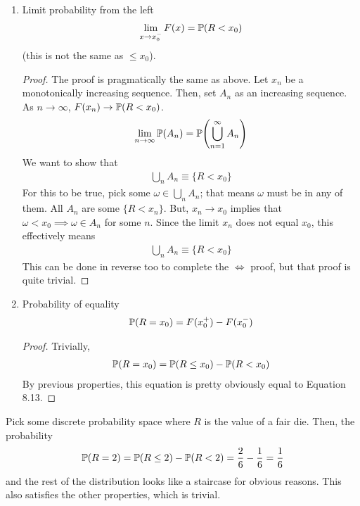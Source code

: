 \begin{enumerate}
    \item Limit probability from the left
    \begin{align}
        \lim_{x \to x_0^-} F(x) = \mathbb{P}(R < x_0)
    \end{align}
    (this is not the same as $\le x_0$).
    \begin{proof}
        The proof is pragmatically the same as above. Let $x_n$ be a monotonically increasing sequence. Then, set $A_n$ as an increasing sequence. As $n\to\infty$, $F(x_n) \to \mathbb{P}(R < x_0)$.
        \begin{align}
            \lim_{n \to \infty}\mathbb{P}(A_n) = \mathbb{P}\qty(\bigcup_{n=1}^\infty A_n)
        \end{align}
        We want to show that
        \begin{align}
            \bigcup_n A_n \equiv \{ R < x_0 \}
        \end{align}
        For this to be true, pick some $\omega \in \bigcup_n A_n$; that means $\omega$ must be in any of them. All $A_n$ are some $\{ R < x_n \}$. But, $x_n \to x_0$ implies that $\omega < x_0 \implies \omega \in A_n$ for some $n$. Since the limit $x_n$ does not equal $x_0$, this effectively means
        \begin{align}
            \bigcup_n A_n \equiv \{ R < x_0 \}
        \end{align}
        This can be done in reverse too to complete the $\iff$ proof, but that proof is quite trivial.
    \end{proof}
    \item Probability of equality
    \begin{align}
        \mathbb{P}(R = x_0) = F(x_0^+) - F(x_0^-)
    \end{align}
    \begin{proof}
        Trivially,
        \begin{align}
            \mathbb{P}(R = x_0) = \mathbb{P}(R \le x_0) - \mathbb{P}(R < x_0)
        \end{align}
        By previous properties, this equation is pretty obviously equal to Equation 8.13.
    \end{proof}
\end{enumerate}

\begin{example}
    Pick some discrete probability space where $R$ is the value of a fair die. Then, the probability
    \begin{align}
        \mathbb{P}(R = 2) = \mathbb{P}(R \le 2) - \mathbb{P}(R < 2) = \frac{2}{6} - \frac{1}{6} = \frac{1}{6}
    \end{align}
    and the rest of the distribution looks like a staircase for obvious reasons. This also satisfies the other properties, which is trivial.
\end{example}

